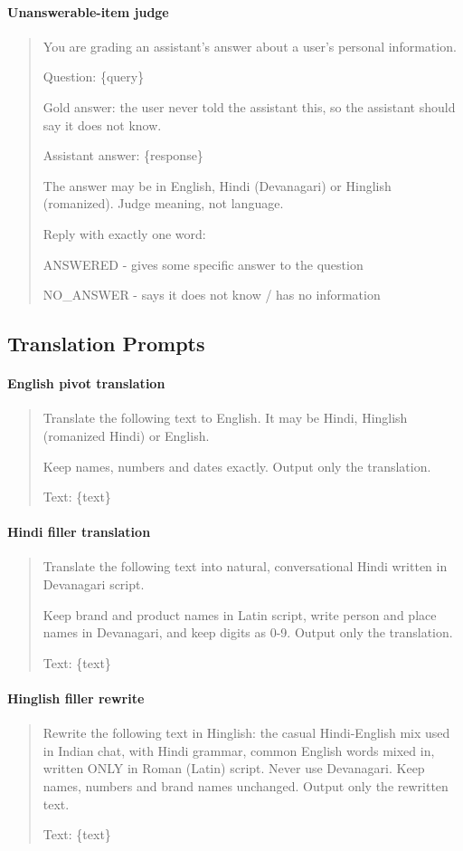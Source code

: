 \documentclass[11pt]{article}
\begin{document}
\paragraph*{Unanswerable-item judge}
\begin{quote}\footnotesize\ttfamily
You are grading an assistant's answer about a user's personal information.\par
Question: \{query\}\par
Gold answer: the user never told the assistant this, so the assistant should say it does not know.\par
Assistant answer: \{response\}\par
The answer may be in English, Hindi (Devanagari) or Hinglish (romanized). Judge meaning, not language.\par
Reply with exactly one word:\par
ANSWERED - gives some specific answer to the question\par
NO\_ANSWER - says it does not know / has no information
\end{quote}

\subsection*{Translation Prompts}
\paragraph*{English pivot translation}
\begin{quote}\footnotesize\ttfamily
Translate the following text to English. It may be Hindi, Hinglish (romanized Hindi) or English.\par
Keep names, numbers and dates exactly. Output only the translation.\par
Text: \{text\}
\end{quote}

\paragraph*{Hindi filler translation}
\begin{quote}\footnotesize\ttfamily
Translate the following text into natural, conversational Hindi written in Devanagari script.\par
Keep brand and product names in Latin script, write person and place names in Devanagari, and keep digits as 0-9. Output only the translation.\par
Text: \{text\}
\end{quote}

\paragraph*{Hinglish filler rewrite}
\begin{quote}\footnotesize\ttfamily
Rewrite the following text in Hinglish: the casual Hindi-English mix used in Indian chat, with Hindi grammar, common English words mixed in, written ONLY in Roman (Latin) script. Never use Devanagari. Keep names, numbers and brand names unchanged. Output only the rewritten text.\par
Text: \{text\}
\end{quote}
\end{document}
